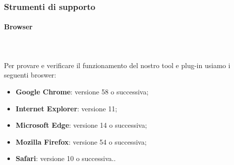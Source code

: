 	\begin{comment}
			\begin{itemize}
			\item \textbf{Linee di Codice}: è la metrica che registra la dimensione di tutto il codice sorgente di un metodo;
			\item \textbf{Numero dei Metodi}: questa metrica conta il numero di metodi presenti in un oggetto. Questo strumento permette di determinare la necessità di modularizzare un oggetto;
			\item \textbf{Numero di Parametri}: un numero elevato di parametri di un metodo comporta ad un alto grado di complessità del problema;
			\item \textbf{Commenti per Linee di Codice}: questa metrica calcola il rapporto tra le linee di commento e quelle di codice effettivo. Permette quindi di stabilire il livello di comprensibilità del codice sorgente da parte del programmatore, visto che un codice commentato risulta più comprensibile di quello sprovvisto di commento o con note superficiali.
			\end{itemize}
			Vengono inoltre definite le seguenti metriche per valutare la qualità dei test effettuati: \begin{itemize}
			\item \textbf{Code Coverage}: indica la percentuale di righe di codice percorse durante il test sulle righe totali durante la loro esecuzione;
			\item \textbf{Passed Test Cases Percentage}: indica la percentuale
di test superati sul totale dei test eseguiti. Un'alta percentuale di superamento
indica la tendenza del codice ad essere già corretto prima dei test;
			\item \textbf{Failed Test Cases Percentage}: indica la percentuale
di test falliti sul totale dei test eseguiti. Un'alta percentuale di fallimento indica la tendenza alla scorrettezza del codice.
			\end{itemize}
			\end{comment}
			\pagebreak
	\subsubsection{Strumenti di supporto}
	\paragraph{Browser}\mbox{} \\ \mbox{} \\
	Per provare e verificare il funzionamento del nostro tool e plug-in usiamo i seguenti broswer: \begin{itemize}
	\item \textbf{Google Chrome}: versione 58 o successiva;
	\item \textbf{Internet Explorer}: versione 11;
	\item \textbf{Microsoft Edge}: versione 14 o successiva;
	\item \textbf{Mozilla Firefox}: versione 54 o successiva;
	\item \textbf{Safari}: versione 10 o successiva..
	\end{itemize}
